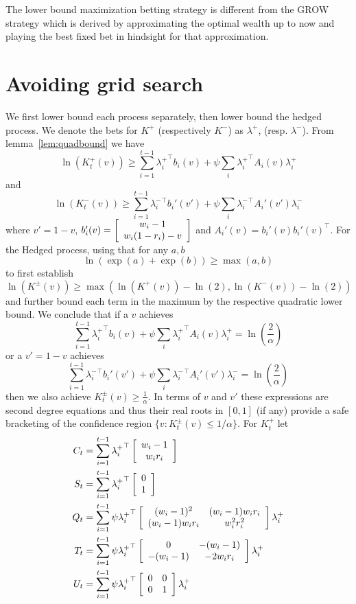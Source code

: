 The lower bound maximization betting strategy is different from 
the GROW strategy \cite{waudby-smith_variance-adaptive_2020} 
which is derived by approximating the optimal wealth up to now 
and playing the best fixed bet in hindsight for that approximation.






\newpage
\onecolumn
\appendix
\section{Avoiding grid search}
\label{app:nogrid2d}
We first lower bound each process separately, then lower bound
the hedged process. We denote the bets for $K^{+}$ (respectively
$K^{-}$) as $\lambda^{+}$, (resp. $\lambda^{-}$).
From lemma~\ref{lem:quadbound} we have
\[
\ln(K_t^{+}(v)) \geq \sum_{i=1}^{t-1} {\lambda_i^{+}}^\top b_i(v) + \psi \sum_i {\lambda_i^{+}}^\top A_i(v) {\lambda_i^{+}}
\]
and
\[
\ln(K_t^{-}(v)) \geq \sum_{i=1}^{t-1} {\lambda_i^{-}}^\top b_i'(v') + \psi \sum_i {\lambda_i^{-}}^\top A_i'(v') {\lambda_i^{-}}
\]
where $v'=1-v$, 
$b_i'(v)=
\left[\begin{array}{c} w_i-1 \\ w_i (1-r_i) -v \end{array}\right]
$
and $A_i'(v)=b_i'(v)b_i'(v)^\top$.
For the Hedged process, using that for any $a,b$
\[
\ln\left(\exp(a)+\exp(b)\right)\geq \max(a,b)
\]
to first establish
\[
\ln(K^{\pm}(v)) \geq \max(\ln(K^{+}(v))-\ln(2),\ln(K^{-}(v))-\ln(2))
\]
and further bound each term in the maximum by the respective 
quadratic lower bound. We conclude that
if a $v$ achieves 
\[
 \sum_{i=1}^{t-1} {\lambda_i^{+}}^\top b_i(v) + \psi \sum_i {\lambda_i^{+}}^\top A_i(v) \lambda_i^{+} = \ln\left(\frac{2}{\alpha}\right)
\]
or a $v'=1-v$ achieves 
\[
\sum_{i=1}^{t-1} {\lambda_i^{-}}^\top b_i'(v') + \psi \sum_i {\lambda_i^{-}}^\top A_i'(v') \lambda_i^{-} = \ln\left(\frac{2}{\alpha}\right)
\]
then we also achieve $K_t^{\pm}(v) \geq \frac{1}{\alpha}$.
In terms of $v$ and $v'$ these expressions are second degree
equations and thus their real roots in $[0,1]$ (if any) provide 
a safe bracketing of the confidence region $\{v:K_t^{\pm}(v)\leq 1/\alpha\}$. For $K_t^{+}$ let
\begin{align}
C_t&= \sum_{i=1}^{t-1} {\lambda_i^{+}}^\top \left[\begin{array}{c} w_i-1 \\ w_i r_i \end{array}\right] \label{eq:upsuffc}\\
S_t&= \sum_{i=1}^{t-1} {\lambda_i^{+}}^\top \left[\begin{array}{c} 0 \\ 1 \end{array}\right] \\
Q_t&= \sum_{i=1}^{t-1} \psi  {\lambda_i^{+}}^\top \left[\begin{array}{cc} (w_i-1)^2 & (w_i-1)w_i r_i \\ (w_i-1)w_i r_i & w_i^2r_i^2 \end{array}\right] \lambda_i^{+} \\
T_t&= \sum_{i=1}^{t-1} \psi  {\lambda_i^{+}}^\top \left[\begin{array}{cc} 0 & -(w_i-1) \\ -(w_i-1) & -2w_ir_i \end{array}\right] \lambda_i^{+} \\
U_t&=  \sum_{i=1}^{t-1} \psi {\lambda_i^{+}}^\top \left[\begin{array}{cc} 0 & 0 \\ 0 & 1 \end{array}\right] \lambda_i^{+} \label{eq:upsuffu}
\end{align}
